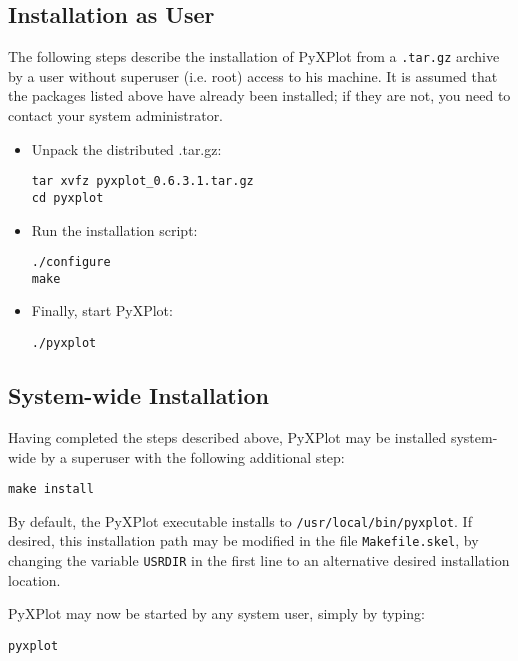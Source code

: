 \subsection{Installation as User}

The following steps describe the installation of PyXPlot from a
\texttt{.tar.gz} archive by a user without superuser (i.e. root) access to his
machine. It is assumed that the packages listed above have already been
installed; if they are not, you need to contact your system administrator.

\begin{itemize}
\item Unpack the distributed .tar.gz:

\begin{verbatim}
tar xvfz pyxplot_0.6.3.1.tar.gz
cd pyxplot
\end{verbatim}

\item Run the installation script:

\begin{verbatim}
./configure
make
\end{verbatim}

\item Finally, start PyXPlot:

\begin{verbatim}
./pyxplot
\end{verbatim}

\end{itemize}

\subsection{System-wide Installation}

Having completed the steps described above, PyXPlot may be installed
system-wide by a superuser with the following additional step:

\begin{verbatim}
make install
\end{verbatim}

By default, the PyXPlot executable installs to \texttt{/usr/local/bin/pyxplot}.
If desired, this installation path may be modified in the file
\texttt{Makefile.skel}, by changing the variable \texttt{USRDIR} in the first
line to an alternative desired installation location.

PyXPlot may now be started by any system user, simply by typing:

\begin{verbatim}
pyxplot
\end{verbatim}

